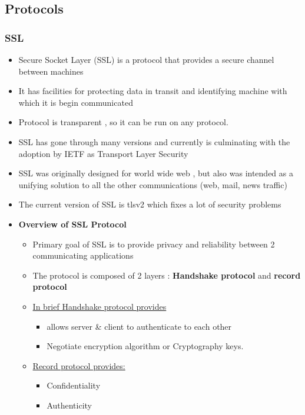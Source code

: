 \documentclass[a4paper]{article}
\begin{document}
\subsection{Protocols}
\subsubsection{SSL}
    \begin{itemize}
        \item Secure Socket Layer (SSL) is a protocol that provides a secure channel between machines
        \item It has facilities for protecting data in transit and identifying machine with which it is begin communicated
        \item Protocol is transparent , so it can be run on any protocol. 
        \item SSL has gone through many versions and currently is culminating with the adoption by IETF as Transport Layer Security
        \item SSL was originally designed for world wide web , but also was intended as a unifying solution to all the other communications (web, mail, news traffic)
        \item The current version of SSL is tlsv2 which fixes a lot of security problems
        \item \textbf{Overview of SSL Protocol}
            \begin{itemize}
                \item Primary goal of SSL is to provide privacy and reliability between 2 communicating applications
                \item The protocol is composed of 2 layers : \textbf{Handshake protocol} and \textbf{record protocol}
                \item \underline{In brief Handshake protocol provides}
                    \begin{itemize}
                        \item allows server \& client to authenticate to each other
                        \item Negotiate encryption algorithm or Cryptography keys. 
                    \end{itemize}
                \item \underline{Record protocol provides:}
                    \begin{itemize}
                        \item Confidentiality
                        \item Authenticity

\end{itemize}
\end{itemize}
\end{itemize}
\end{document}
